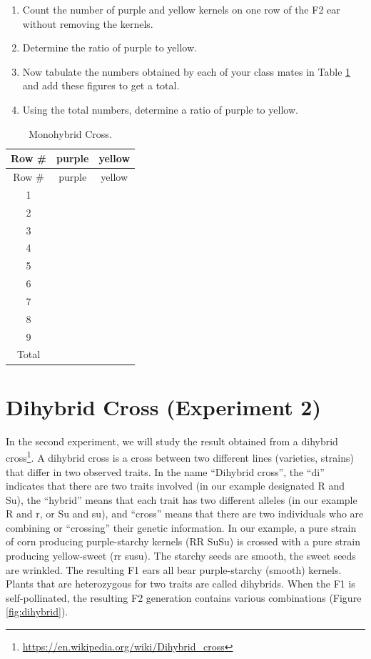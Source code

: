 \documentclass[]{book}
\providecommand{\tightlist}{%
  \setlength{\itemsep}{0pt}\setlength{\parskip}{0pt}}
\let\rmarkdownfootnote\footnote%
\def\footnote{\protect\rmarkdownfootnote}
\renewcommand{\href}[2]{#2\footnote{\url{#1}}}
\begin{document}
\begin{enumerate}
\def\labelenumi{\arabic{enumi}.}
\tightlist
\item
  Count the number of purple and yellow kernels on one row of the F2 ear
  without removing the kernels.
\item
  Determine the ratio of purple to yellow.
\item
  Now tabulate the numbers obtained by each of your class mates in Table
  \ref{tab:mono} and add these figures to get a total.
\item
  Using the total numbers, determine a ratio of purple to yellow.
\end{enumerate}

\begin{longtable}[]{@{}ccc@{}}
\caption{\label{tab:mono} Monohybrid Cross.}\tabularnewline
\toprule
Row \# & purple & yellow\tabularnewline
\midrule
\endfirsthead
\toprule
Row \# & purple & yellow\tabularnewline
\midrule
\endhead
1 & &\tabularnewline
2 & &\tabularnewline
3 & &\tabularnewline
4 & &\tabularnewline
5 & &\tabularnewline
6 & &\tabularnewline
7 & &\tabularnewline
8 & &\tabularnewline
9 & &\tabularnewline
Total & &\tabularnewline
\bottomrule
\end{longtable}

\section{Dihybrid Cross (Experiment
2)}\label{dihybrid-cross-experiment-2}

In the second experiment, we will study the result obtained from a
\href{https://en.wikipedia.org/wiki/Dihybrid_cross}{dihybrid cross}. A
dihybrid cross is a cross between two different lines (varieties,
strains) that differ in two observed traits. In the name ``Dihybrid
cross'', the ``di'' indicates that there are two traits involved (in our
example designated R and Su), the ``hybrid'' means that each trait has
two different alleles (in our example R and r, or Su and su), and
``cross'' means that there are two individuals who are combining or
``crossing'' their genetic information. In our example, a pure strain of
corn producing purple-starchy kernels (RR SuSu) is crossed with a pure
strain producing yellow-sweet (rr susu). The starchy seeds are smooth,
the sweet seeds are wrinkled. The resulting F1 ears all bear
purple-starchy (smooth) kernels. Plants that are heterozygous for two
traits are called dihybrids. When the F1 is self-pollinated, the
resulting F2 generation contains various combinations (Figure
\ref{fig:dihybrid}).
\end{document}
